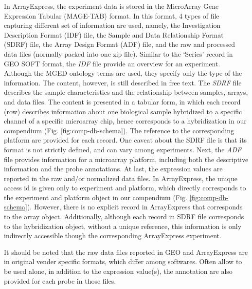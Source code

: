 %
In ArrayExpress, the experiment data is stored in the MicroArray Gene
Expression Tabular (MAGE-TAB) format.
%
In this format, 4 types of file capturing different set of information are
used, namely, the Investigation Description Format (IDF) file, the Sample and
Data Relationship Format (SDRF) file, the Array Design Format (ADF) file, and
the raw and processed data files (normally packed into one zip file).
%
Similar to the `Series' record in GEO SOFT format, the \textit{IDF} file
provide an overview for an experiment.
%
Although the MGED ontology terms are used, they specify only the type of the
information.  The content, however, is still described in free text.
%
The \textit{SDRF} file describes the sample characteristics and the
relationship between samples, arrays, and data files.
%
The content is presented in a tabular form, in which each record (row)
describes information about one biological sample hybridized to a specific
channel of a specific microarray chip, hence corresponds to a hybridization in
our compendium (Fig. \ref{fig:comp-db-schema}).
%
The reference to the corresponding platform are provided for each record.
%
One caveat about the SDRF file is that its format is not strictly defined, and
can vary among experiments.
%
Next, the \textit{ADF} file provides information for a microarray platform,
including both the descriptive information and the probe annotations.
%
At last, the expression values are reported in the raw and/or normalized
data files.
%
In ArrayExpress, the unique access id is given only to experiment and
platform, which directly corresponds to the experiment and platform object
in our compendium (Fig. \ref{fig:comp-db-schema}).
%
However, there is no explicit record in ArrayExpress that corresponds to the
array object.  Additionally, although each record in SDRF file corresponds to
the hybridization object, without a unique reference, this information is only
indirectly accessible though the corresponding ArrayExpress experiment.
%

It should be noted that the raw data files reported in GEO and ArrayExpress
are in original vender specific formats, which differ among softwares.
%
Often allow to be used alone, in addition to the expression value(s), the
annotation are also provided for each probe in those files.







